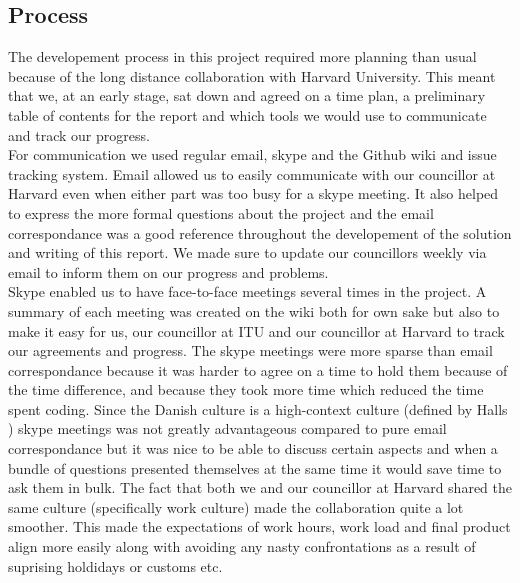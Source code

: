 
\subsection{Process}
\label{process}


The developement process in this project required more planning than usual because of the long distance collaboration with Harvard University. This meant that we, at an early stage, sat down and agreed on a time plan, a preliminary table of contents for the report and which tools we would use to communicate and track our progress. \\

For communication we used regular email, skype and the Github \cite{github} wiki and issue tracking system. Email allowed us to easily communicate with our councillor at Harvard even when either part was too busy for a skype meeting. It also helped to express the more formal questions about the project and the email correspondance was a good reference throughout the developement of the solution and writing of this report. We made sure to update our councillors weekly via email to inform them on our progress and problems.\\

Skype enabled us to have face-to-face meetings several times in the project. A summary of each meeting was created on the wiki both for own sake but also to make it easy for us, our councillor at ITU and our councillor at Harvard to track our agreements and progress. The skype meetings were more sparse than email correspondance because it was harder to agree on a time to hold them because of the time difference, and because they took more time which reduced the time spent coding. Since the Danish culture is a high-context culture (defined by Halls \cite{halls}) skype meetings was not greatly advantageous compared to pure email correspondance but it was nice to be able to discuss certain aspects and when a bundle of questions presented themselves at the same time it would save time to ask them in bulk. The fact that both we and our councillor at Harvard shared the same culture (specifically work culture) made the collaboration quite a lot smoother. This made the expectations of work hours, work load and final product align more easily along with avoiding any nasty confrontations as a result of suprising holdidays or customs etc. \\

